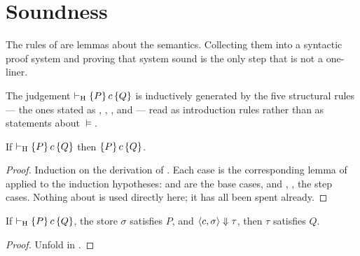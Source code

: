 \section{Soundness}
\label{sec:soundness}

The rules of  are lemmas about the semantics. Collecting them
into a syntactic proof system and proving that system sound is the only step
that is not a one-liner.

\begin{definition}
\label{def:derivable}
The judgement $\vdash_{\mathrm{H}} \{P\}\, c \,\{Q\}$ is inductively generated by the five
structural rules --- the ones stated as
,
,
,
 and
 --- read as introduction rules rather than as
statements about $\models$.
\end{definition}

\begin{theorem}[soundness]
\label{thm:soundness}
If $\vdash_{\mathrm{H}} \{P\}\, c \,\{Q\}$ then $\{P\}\, c \,\{Q\}$.
\end{theorem}

\begin{proof}
Induction on the derivation of . Each case is the
corresponding lemma of  applied to the induction hypotheses:
 and  are the base cases, and
, ,  the step
cases. Nothing about  is used directly here; it has all been
spent already.
\end{proof}

\begin{corollary}
\label{cor:derivable-holds}
If $\vdash_{\mathrm{H}} \{P\}\, c \,\{Q\}$, the store $\sigma$ satisfies $P$, and
$\langle c, \sigma\rangle \Downarrow \tau$, then $\tau$ satisfies $Q$.
\end{corollary}

\begin{proof}
Unfold  in .
\end{proof}
